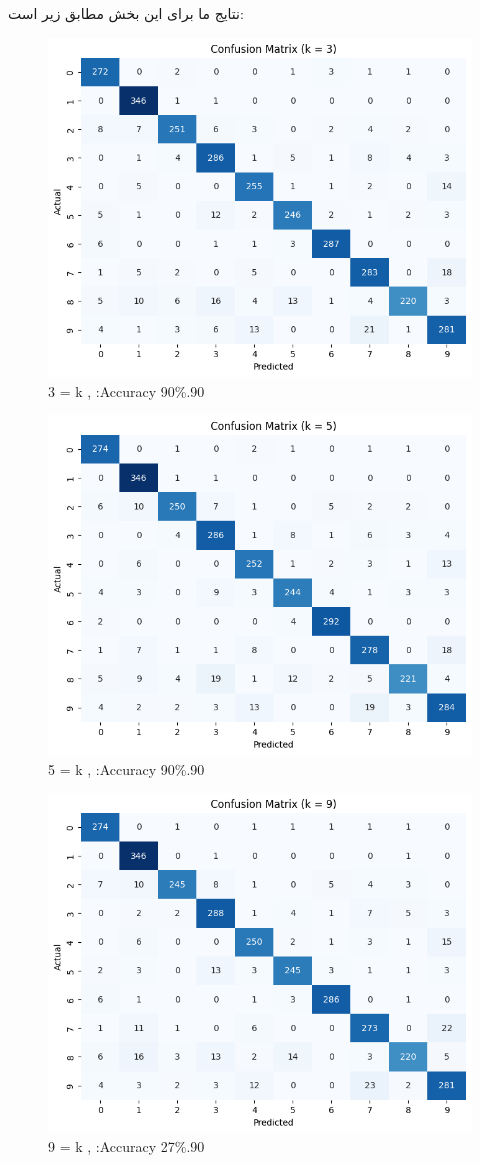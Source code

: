 \documentclass{article}
\begin{document}
نتایج ما برای این بخش مطابق زیر است:

\begin{figure}[h!]
    \centering
    \includegraphics[width=0.6\linewidth]{q2_p31.png}
    \caption{3 = k , :Accuracy 90\%.90}
    \label{fig231}
\end{figure}

\begin{figure}[h!]
    \centering
    \includegraphics[width=0.6\linewidth]{q2_p32.png}
    \caption{5 = k , :Accuracy 90\%.90}
    \label{fig232}
\end{figure}

\begin{figure}[h!]
    \centering
    \includegraphics[width=0.6\linewidth]{q2_p33.png}
    \caption{9 = k , :Accuracy 27\%.90}
    \label{fig233}
\end{figure}
\end{document}
